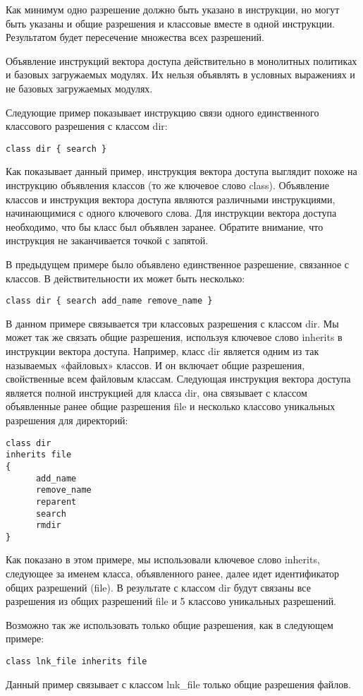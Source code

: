 \documentclass{./../class/UIR}
\begin{document}
    Как минимум одно разрешение должно быть указано в инструкции, но могут быть
    указаны и общие разрешения и классовые вместе в одной инструкции. Результатом
    будет пересечение множества всех разрешений.

    Объявление инструкций вектора доступа действительно в монолитных политиках и
    базовых загружаемых модулях. Их нельзя объявлять в условных выражениях и не
    базовых загружаемых модулях.

    Следующие пример показывает инструкцию связи одного единственного классового
    разрешения с классом dir:
\begin{verbatim}
class dir { search }
\end{verbatim}
    Как показывает данный пример, инструкция вектора доступа выглядит похоже на
    инструкцию объявления классов (то же ключевое слово class). Объявление
    классов и инструкция вектора доступа являются различными инструкциями,
    начинающимися с одного ключевого слова. Для инструкции вектора доступа
    необходимо, что бы класс был объявлен заранее. Обратите внимание, что
    инструкция не заканчивается точкой с запятой.

    В предыдущем примере было объявлено единственное разрешение, связанное с
    классов. В действительности их может быть несколько:
\begin{verbatim}
class dir { search add_name remove_name }
\end{verbatim}
    В данном примере связывается три классовых разрешения с классом dir. Мы
    может так же связать общие разрешения, используя ключевое слово inherits в
    инструкции вектора доступа. Например, класс dir является одним из так
    называемых «файловых» классов. И он включает общие разрешения, свойственные
    всем файловым классам. Следующая инструкция вектора доступа является полной
    инструкцией для класса dir, она связывает с классом объявленные ранее общие
    разрешения file и несколько классово уникальных разрешения для директорий:
\begin{verbatim}
class dir
inherits file
{
      add_name
	  remove_name
      reparent
      search
      rmdir
}
\end{verbatim}
    Как показано в этом примере, мы использовали ключевое слово inherits, следующее
    за именем класса, объявленного ранее, далее идет идентификатор общих разрешений
    (file). В результате с классом dir будут связаны все разрешения из общих
    разрешений file и 5 классово уникальных разрешений.

    Возможно так же использовать только общие разрешения, как в следующем примере:
    \begin{verbatim}
class lnk_file inherits file
    \end{verbatim}
    Данный пример связывает с классом lnk\_file только общие разрешения файлов.
\end{document}
